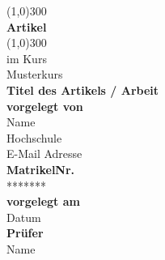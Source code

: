 	\begin{titlepage}

		\begin{center}
		\line(1,0){300} \\
		[2mm]
		\huge{\bfseries Artikel} \\
		\line(1,0){300} \\
		[1cm]

		\large{im Kurs \\ Musterkurs} \\
		[1cm]
		\LARGE{\textbf{Titel des Artikels / Arbeit}} \\
		[1.5cm]

		\large{\textbf {vorgelegt von} \\ Name \\ 
		Hochschule \\
		E-Mail Adresse} \\
		[0.5cm]
		\large{\textbf{MatrikelNr.} \\ *******} \\
		[0.5cm]
		\large{\textbf{vorgelegt am} \\ Datum} \\
		[0.5cm]
		\large{\textbf{Prüfer} \\ Name} \\ 

	\end{center}
\end{titlepage}
